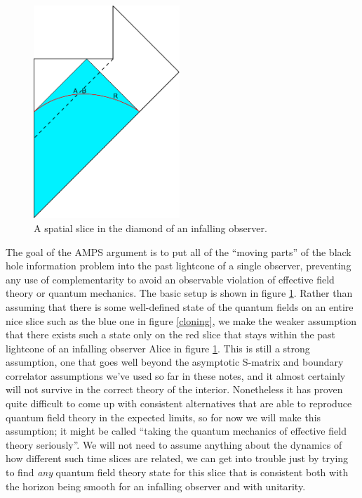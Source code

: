 \documentclass[12pt]{article}
\begin{document}
\begin{figure}
\begin{center}
\includegraphics[height=8cm]{alice.pdf}
\caption{A spatial slice in the diamond of an infalling observer.}\label{alice}
\end{center}
\end{figure}
The goal of the AMPS argument is to put all of the ``moving parts'' of the black hole information problem into the past lightcone of a single observer, preventing any use of complementarity to avoid an observable violation of effective field theory or quantum mechanics.  The basic setup is shown in figure \ref{alice}.  Rather than assuming that there is some well-defined state of the quantum fields on an entire nice slice such as the blue one in figure \ref{cloning}, we make the weaker assumption that there exists such a state only on the red slice that stays within the past lightcone of an infalling observer Alice in figure \ref{alice}. This is still a strong assumption, one that goes well beyond the asymptotic S-matrix and boundary correlator assumptions we've used so far in these notes, and it almost certainly will not survive in the correct theory of the interior.  Nonetheless it has proven quite difficult to come up with consistent alternatives that are able to reproduce quantum field theory in the expected limits, so for now we will make this assumption; it might be called ``taking the quantum mechanics of effective field theory seriously''.  We will not need to assume anything about the dynamics of how different such time slices are related, we can get into trouble just by trying to find \textit{any} quantum field theory state for this slice that is consistent both with the horizon being smooth for an infalling observer and with unitarity.
\end{document}
